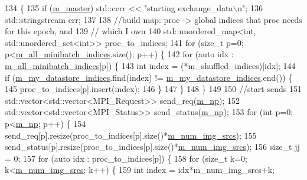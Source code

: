 \begin{DoxyCode}
134                                      \{
135   \textcolor{keywordflow}{if} (\hyperlink{classlbann_1_1generic__data__store_a143fd33ef3a53180bc62745e369c16f8}{m\_master}) std::cerr << \textcolor{stringliteral}{"starting exchange\_data\(\backslash\)n"};
136   std::stringstream err;
137 
138   \textcolor{comment}{//build map: proc -> global indices that proc needs for this epoch, and}
139   \textcolor{comment}{//                   which I own}
140   std::unordered\_map<int, std::unordered\_set<int>> proc\_to\_indices;
141   \textcolor{keywordflow}{for} (\textcolor{keywordtype}{size\_t} p=0; p<\hyperlink{classlbann_1_1generic__data__store_afd21d4f029e450328f8703dd72702e73}{m\_all\_minibatch\_indices}.size(); p++) \{
142     \textcolor{keywordflow}{for} (\textcolor{keyword}{auto} idx : \hyperlink{classlbann_1_1generic__data__store_afd21d4f029e450328f8703dd72702e73}{m\_all\_minibatch\_indices}[p]) \{
143       \textcolor{keywordtype}{int} index = (*m\_shuffled\_indices)[idx];
144       \textcolor{keywordflow}{if} (\hyperlink{classlbann_1_1generic__data__store_abd38f8d8aab0648959e09d011abfe20a}{m\_my\_datastore\_indices}.find(index) != 
      \hyperlink{classlbann_1_1generic__data__store_abd38f8d8aab0648959e09d011abfe20a}{m\_my\_datastore\_indices}.end()) \{
145         proc\_to\_indices[p].insert(index);
146       \}
147     \}
148   \}
149 
150   \textcolor{comment}{//start sends}
151   std::vector<std::vector<MPI\_Request>> send\_req(\hyperlink{classlbann_1_1generic__data__store_afcd4f99959c265c8c03dcf8ad3779d85}{m\_np});
152   std::vector<std::vector<MPI\_Status>> send\_status(\hyperlink{classlbann_1_1generic__data__store_afcd4f99959c265c8c03dcf8ad3779d85}{m\_np});
153   \textcolor{keywordflow}{for} (\textcolor{keywordtype}{int} p=0; p<\hyperlink{classlbann_1_1generic__data__store_afcd4f99959c265c8c03dcf8ad3779d85}{m\_np}; p++) \{
154     send\_req[p].resize(proc\_to\_indices[p].size()*\hyperlink{classlbann_1_1data__store__image_a2f660053e7621a9cc70a7c4eef53c9cc}{m\_num\_img\_srcs});
155     send\_status[p].resize(proc\_to\_indices[p].size()*\hyperlink{classlbann_1_1data__store__image_a2f660053e7621a9cc70a7c4eef53c9cc}{m\_num\_img\_srcs});
156     \textcolor{keywordtype}{size\_t} jj = 0;
157     \textcolor{keywordflow}{for} (\textcolor{keyword}{auto} idx : proc\_to\_indices[p]) \{
158       \textcolor{keywordflow}{for} (\textcolor{keywordtype}{size\_t} k=0; k<\hyperlink{classlbann_1_1data__store__image_a2f660053e7621a9cc70a7c4eef53c9cc}{m\_num\_img\_srcs}; k++) \{
159         \textcolor{keywordtype}{int} index = idx*m\_num\_img\_srcs+k;

\end{DoxyCode}
